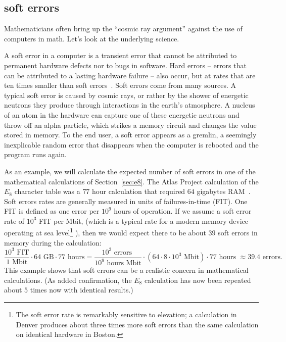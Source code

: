 \documentclass{llncs}
\begin{document}
\subsection{soft errors}\label{sec:soft}

Mathematicians often bring up the ``cosmic ray argument'' against the
use of computers in math.  Let's look at the underlying science.

A soft error in a computer is a transient error that cannot be
attributed to permanent hardware defects nor to bugs in software.
Hard errors -- errors that can be attributed to a lasting hardware
failure -- also occur, but at rates that are ten times smaller than
soft errors~\cite{MW04}.
Soft errors come from many sources. A typical soft error is caused by
cosmic rays, or rather by the shower of energetic neutrons they
produce through interactions in the earth's atmosphere.  A nucleus of
an atom in the hardware can capture one of these energetic neutrons
and throw off an alpha particle, which strikes a memory circuit and
changes the value stored in memory.  To the end user, a soft error
appears as a gremlin, a seemingly inexplicable random error that
disappears when the computer is rebooted and the program runs again.

As an example, we will calculate the expected number of soft errors in
one of the mathematical calculations of Section~\ref{sec:e8}.  The
Atlas Project calculation of the $E_8$ character table was a $77$ hour
calculation that required $64$ gigabytes RAM~\cite{AtlasSlides}.  Soft
errors rates are generally measured in units of failures-in-time
(FIT). One FIT is defined as one error per $10^9$ hours of operation.
If we assume a soft error rate of $10^3$ FIT per Mbit, (which is a
typical rate for a modern memory device operating at sea
level\footnote{The soft error rate is remarkably sensitive to
  elevation; a calculation in Denver produces about three times more
  soft errors than the same calculation on identical hardware in Boston.}
\cite{WP}),
 then we would expect there to be about $39$ soft
errors in memory during the calculation:
\[
\frac{10^3 \text{~FIT}}{1\text{~Mbit}} \cdot 64 \text{~GB} \cdot 77\text{~hours} =
\frac{10^3 \text{~errors~}}{10^9\text{~hours~}\text{Mbit}} \cdot
({64\cdot 8\cdot 10^3 \text{~Mbit}}) \cdot 77\text{~hours~} 
\approx 39.4 \text{~errors}.
\]
This example shows that soft errors can be a realistic concern in
mathematical calculations.  (As added confirmation, the $E_8$
calculation has now been repeated about $5$ times now with identical
results.)
\end{document}
